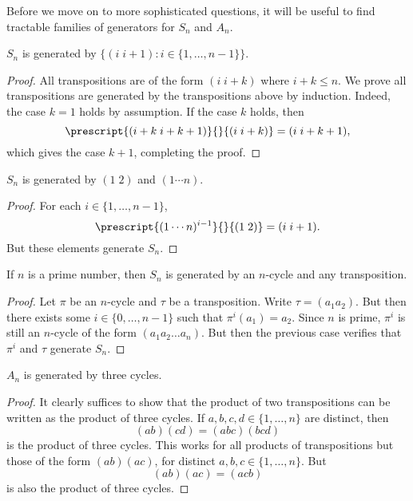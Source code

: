 Before we move on to more sophisticated questions, it will be useful to find tractable families of generators for $S_n$ and $A_n$.

\begin{lemma}
    $S_n$ is generated by $\{ (i\; i+1): i \in \{ 1, \dots, n -1 \} \}$.
\end{lemma}
\begin{proof}
    All transpositions are of the form $(i\; i+k)$ where $i + k \leq n$. We prove all transpositions are generated by the transpositions above by induction. Indeed, the case $k = 1$ holds by assumption. If the case $k$ holds, then
    \[ \prescript{(i+k\; i+k+1)}{}{(i\; i+k)} = (i\; i+k+1), \]
    which gives the case $k+1$, completing the proof.
\end{proof}

\begin{lemma}
    $S_n$ is generated by $(1\; 2)$ and $(1 \cdots n)$.
\end{lemma}
\begin{proof}
    For each $i \in \{ 1, \dots, n-1 \}$,
    \[ \prescript{(1 \cdots n)^{i-1}}{}{(1\; 2)} = (i\; i+1). \]
    But these elements generate $S_n$.
\end{proof}

\begin{lemma}
    If $n$ is a prime number, then $S_n$ is generated by an $n$-cycle and any transposition.
\end{lemma}
\begin{proof}
    Let $\pi$ be an $n$-cycle and $\tau$ be a transposition. Write $\tau = (a_1 a_2)$. But then there exists some $i \in \{ 0, \dots, n-1 \}$ such that $\pi^i(a_1) = a_2$. Since $n$ is prime, $\pi^i$ is still an $n$-cycle of the form $(a_1 a_2 \dots a_n)$. But then the previous case verifies that $\pi^i$ and $\tau$ generate $S_n$.
\end{proof}

\begin{lemma}
    $A_n$ is generated by three cycles.
\end{lemma}
\begin{proof}
    It clearly suffices to show that the product of two transpositions can be written as the product of three cycles. If $a,b,c,d \in \{ 1, \dots, n \}$ are distinct, then
    \[ (ab)(cd) = (abc)(bcd) \]
    is the product of three cycles. This works for all products of transpositions but those of the form $(ab)(ac)$, for distinct $a,b,c \in \{ 1, \dots, n \}$. But
    \[ (ab)(ac) = (acb) \]
    is also the product of three cycles.
\end{proof}

